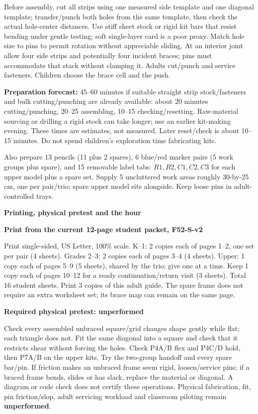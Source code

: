 \documentclass[letterpaper,11pt]{article}
\newcommand{\titleline}[1]{\par{\large\bfseries #1}\par}
\newcommand{\sub}[1]{\par\textbf{#1}\par}
\begin{document}
Before assembly, cut all strips using one measured side template and one diagonal template; transfer/punch both holes from the same template, then check the actual hole-center distances. Use stiff sheet stock or rigid kit bars that resist bending under gentle testing; soft single-layer card is a poor proxy. Match hole size to pins to permit rotation without appreciable sliding. At an interior joint allow four side strips and potentially four incident braces; pins must accommodate that stack without clamping it. Adults cut/punch and service fasteners. Children choose the brace cell and the push.

\textbf{Preparation forecast:} 45--60 minutes if suitable straight strip stock/fasteners and bulk cutting/punching are already available: about 20 minutes cutting/punching, 20--25 assembling, 10--15 checking/resetting. Raw-material sourcing or drilling a rigid stock can take longer; use an earlier kit-making evening. These times are estimates, not measured. Later reset/check is about 10--15 minutes. Do not spend children's exploration time fabricating kits.

Also prepare 13 pencils (11 plus 2 spares), 6 blue/red marker pairs (5 work groups plus spare), and 15 removable label tabs: $R1,R2,C1,C2,C3$ for each upper model plus a spare set. Supply 5 uncluttered work areas roughly 30-by-25 cm, one per pair/trio; spare upper model sits alongside. Keep loose pins in adult-controlled trays.

\newpage
\titleline{Printing, physical pretest and the hour}
\sub{Print from the current 12-page student packet, F52-S-v2}
Print single-sided, US Letter, 100\% scale. K--1: 2 copies each of pages 1--2, one set per pair (4 sheets). Grades 2--3: 2 copies each of pages 3--4 (4 sheets). Upper: 1 copy each of pages 5--9 (5 sheets), shared by the trio; give one at a time. Keep 1 copy each of pages 10--12 for a ready continuation/return visit (3 sheets). Total 16 student sheets. Print 3 copies of this adult guide. The spare frame does not require an extra worksheet set; its brace map can remain on the same page.

\sub{Required physical pretest: unperformed}
Check every assembled unbraced square/grid changes shape gently while flat; each triangle does not. Fit the same diagonal into a square and check that it restricts shear without forcing the holes. Check P4A/B flex and P4C/D hold, then P7A/B on the upper kits. Try the two-group handoff and every spare bar/pin. If friction makes an unbraced frame seem rigid, loosen/service pins; if a braced frame bends, slides or has slack, replace the material or diagonal. A diagram or code check does not certify these operations. Physical fabrication, fit, pin friction/slop, adult servicing workload and classroom piloting remain \textbf{unperformed}.
\end{document}

